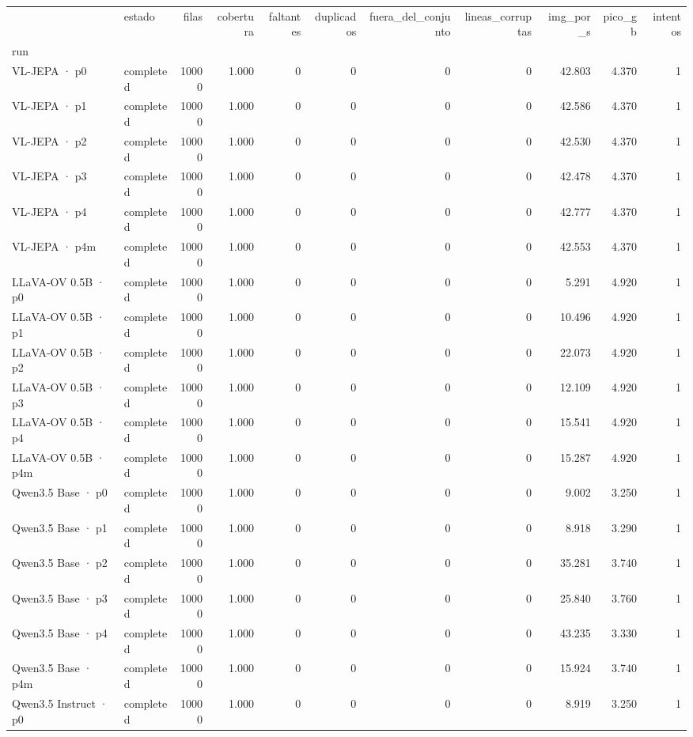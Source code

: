 \begin{tabular}{llrrrrrrrrr}
\toprule
 & estado & filas & cobertura & faltantes & duplicados & fuera\_del\_conjunto & lineas\_corruptas & img\_por\_s & pico\_gb & intentos \\
run &  &  &  &  &  &  &  &  &  &  \\
\midrule
VL-JEPA · p0 & completed & 10000 & 1.000 & 0 & 0 & 0 & 0 & 42.803 & 4.370 & 1 \\
VL-JEPA · p1 & completed & 10000 & 1.000 & 0 & 0 & 0 & 0 & 42.586 & 4.370 & 1 \\
VL-JEPA · p2 & completed & 10000 & 1.000 & 0 & 0 & 0 & 0 & 42.530 & 4.370 & 1 \\
VL-JEPA · p3 & completed & 10000 & 1.000 & 0 & 0 & 0 & 0 & 42.478 & 4.370 & 1 \\
VL-JEPA · p4 & completed & 10000 & 1.000 & 0 & 0 & 0 & 0 & 42.777 & 4.370 & 1 \\
VL-JEPA · p4m & completed & 10000 & 1.000 & 0 & 0 & 0 & 0 & 42.553 & 4.370 & 1 \\
LLaVA-OV 0.5B · p0 & completed & 10000 & 1.000 & 0 & 0 & 0 & 0 & 5.291 & 4.920 & 1 \\
LLaVA-OV 0.5B · p1 & completed & 10000 & 1.000 & 0 & 0 & 0 & 0 & 10.496 & 4.920 & 1 \\
LLaVA-OV 0.5B · p2 & completed & 10000 & 1.000 & 0 & 0 & 0 & 0 & 22.073 & 4.920 & 1 \\
LLaVA-OV 0.5B · p3 & completed & 10000 & 1.000 & 0 & 0 & 0 & 0 & 12.109 & 4.920 & 1 \\
LLaVA-OV 0.5B · p4 & completed & 10000 & 1.000 & 0 & 0 & 0 & 0 & 15.541 & 4.920 & 1 \\
LLaVA-OV 0.5B · p4m & completed & 10000 & 1.000 & 0 & 0 & 0 & 0 & 15.287 & 4.920 & 1 \\
Qwen3.5 Base · p0 & completed & 10000 & 1.000 & 0 & 0 & 0 & 0 & 9.002 & 3.250 & 1 \\
Qwen3.5 Base · p1 & completed & 10000 & 1.000 & 0 & 0 & 0 & 0 & 8.918 & 3.290 & 1 \\
Qwen3.5 Base · p2 & completed & 10000 & 1.000 & 0 & 0 & 0 & 0 & 35.281 & 3.740 & 1 \\
Qwen3.5 Base · p3 & completed & 10000 & 1.000 & 0 & 0 & 0 & 0 & 25.840 & 3.760 & 1 \\
Qwen3.5 Base · p4 & completed & 10000 & 1.000 & 0 & 0 & 0 & 0 & 43.235 & 3.330 & 1 \\
Qwen3.5 Base · p4m & completed & 10000 & 1.000 & 0 & 0 & 0 & 0 & 15.924 & 3.740 & 1 \\
Qwen3.5 Instruct · p0 & completed & 10000 & 1.000 & 0 & 0 & 0 & 0 & 8.919 & 3.250 & 1 \\

\end{tabular}
